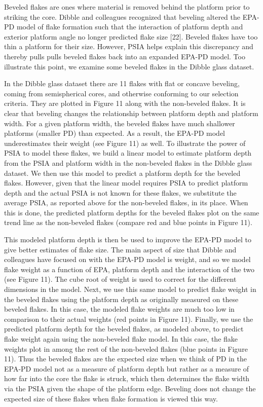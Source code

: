 \documentclass[10pt,letterpaper]{article}
\begin{document}
Beveled flakes are ones where material is removed behind the platform
prior to striking the core. Dibble and colleagues recognized that
beveling altered the EPA-PD model of flake formation such that the
interaction of platform depth and exterior platform angle no longer
predicted flake size {[}22{]}. Beveled flakes have too thin a platform
for their size. However, PSIA helps explain this discrepancy and thereby
pulls pulls beveled flakes back into an expanded EPA-PD model. Too
illustrate this point, we examine some beveled flakes in the Dibble
glass dataset.

In the Dibble glass dataset there are 11 flakes with flat or concave
beveling, coming from semispherical cores, and otherwise conforming to
our selection criteria. They are plotted in Figure 11 along with the
non-beveled flakes. It is clear that beveling changes the relationship
between platform depth and platform width. For a given platform width,
the beveled flakes have much shallower platforms (smaller PD) than
expected. As a result, the EPA-PD model underestimates their weight (see
Figure 11) as well. To illustrate the power of PSIA to model these
flakes, we build a linear model to estimate platform depth from the PSIA
and platform width in the non-beveled flakes in the Dibble glass
dataset. We then use this model to predict a platform depth for the
beveled flakes. However, given that the linear model requires PSIA to
predict platform depth and the actual PSIA is not known for these
flakes, we substitute the average PSIA, as reported above for the
non-beveled flakes, in its place. When this is done, the predicted
platform depths for the beveled flakes plot on the same trend line as
the non-beveled flakes (compare red and blue points in Figure 11).

This modeled platform depth is then be used to improve the EPA-PD model
to give better estimates of flake size. The main aspect of size that
Dibble and colleagues have focused on with the EPA-PD model is weight,
and so we model flake weight as a function of EPA, platform depth and
the interaction of the two (see Figure 11). The cube root of weight is
used to correct for the different dimensions in the model. Next, we use
this same model to predict flake weight in the beveled flakes using the
platform depth as originally measured on these beveled flakes. In this
case, the modeled flake weights are much too low in comparison to their
actual weights (red points in Figure 11). Finally, we use the predicted
platform depth for the beveled flakes, as modeled above, to predict
flake weight again using the non-beveled flake model. In this case, the
flake weights plot in among the rest of the non-beveled flakes (blue
points in Figure 11). Thus the beveled flakes are the expected size when
we think of PD in the EPA-PD model not as a measure of platform depth
but rather as a measure of how far into the core the flake is struck,
which then determines the flake width via the PSIA given the shape of
the platform edge. Beveling does not change the expected size of these
flakes when flake formation is viewed this way.
\end{document}
